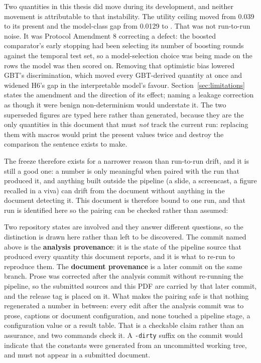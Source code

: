 Two quantities in this thesis did move during its development, and neither
movement is attributable to that instability. The utility ceiling moved from
0.039 to its present \pcUtilityMaxGbtB{} and the model-class gap from 0.0129 to
\pcHSixAbsEst. That was not run-to-run noise. It was Protocol Amendment 8
correcting a defect: the boosted comparator's early stopping had been selecting
its number of boosting rounds against the temporal test set, so a
model-selection choice was being made on the rows the model was then scored on.
Removing that optimistic bias lowered GBT's discrimination, which moved every
GBT-derived quantity at once and widened H6's gap in the interpretable model's
favour. Section~\ref{sec:limitations} states the amendment and the direction of
its effect; naming a leakage correction as though it were benign
non-determinism would understate it. The two superseded figures are typed here
rather than generated, because they are the only quantities in this document
that must \emph{not} track the current run: replacing them with macros would
print the present values twice and destroy the comparison the sentence exists to
make.

The freeze therefore exists for a narrower reason than run-to-run drift, and it
is still a good one: a number is only meaningful when paired with the run that
produced it, and anything built outside the pipeline (a slide, a screencast, a
figure recalled in a viva) can drift from the document without anything in the
document detecting it. This document is therefore bound to one run, and that run is
identified here so the pairing can be checked rather than assumed:

\begin{center}
\end{center}

Two repository states are involved and they answer different questions, so the
distinction is drawn here rather than left to be discovered. The commit named
above is the \textbf{analysis provenance}: it is the state of the pipeline
source that produced every quantity this document reports, and it is what to
re-run to reproduce them. The \textbf{document provenance} is a later commit on
the same branch. Prose was corrected after the analysis commit without
re-running the pipeline, so the submitted sources and this PDF are carried by
that later commit, and the release tag is placed on it. What makes the pairing
safe is that nothing regenerated a number in between: every edit after the
analysis commit was to prose, captions or document configuration, and none
touched a pipeline stage, a configuration value or a result table. That is a
checkable claim rather than an assurance, and two commands check it. A
\texttt{-dirty} suffix on the commit would indicate that the constants were
generated from an uncommitted working tree, and must not appear in a submitted
document.

